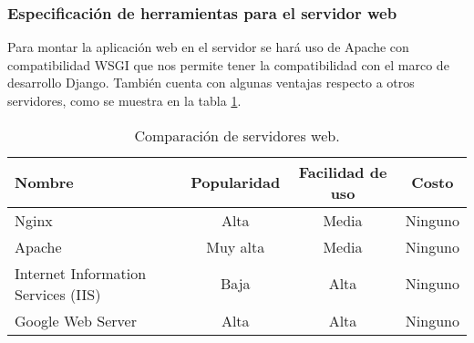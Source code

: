 
\subsubsection{Especificación de herramientas para el servidor web}

Para montar la aplicación web en el servidor se hará uso de Apache con compatibilidad WSGI que nos permite tener la compatibilidad con el marco de desarrollo Django. También cuenta con algunas ventajas respecto a otros servidores, como se muestra en la tabla \ref{tabla:servidores-web}.

\begin{table}[H]
	\centering
	\caption{Comparación de servidores web.}
	\label{tabla:servidores-web}
	\begin{tabular}{|m{3cm}|c|c|c|}
		\hline
		\centering\textbf{Nombre} &
		\textbf{Popularidad} &
		\textbf{Facilidad de uso} &
		\textbf{Costo}
		\\ \hline
		Nginx &
		Alta &
		Media &
		Ninguno
		\\ \hline
		\rowcolor{colorGrisClaro}
		Apache &
		Muy alta &
		Media &
		Ninguno
		\\ \hline
		Internet Information Services (IIS) &
		Baja &
		Alta &
		Ninguno
		\\ \hline
		Google Web Server &
		Alta &
		Alta &
		Ninguno
		\\ \hline
	\end{tabular}
\end{table}